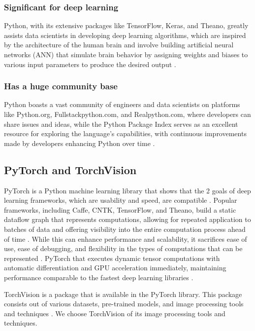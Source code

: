 \documentclass[conference]{IEEEtran}
\begin{document}
\subsubsection{Significant for deep learning}

Python, with its extensive packages like TensorFlow, Keras, and Theano, greatly assists data scientists in developing deep learning algorithms, which are inspired by the architecture of the human brain and involve building artificial neural networks (ANN) that simulate brain behavior by assigning weights and biases to various input parameters to produce the desired output \cite{b8}.

\subsubsection{Has a huge community base}

Python boasts a vast community of engineers and data scientists on platforms like Python.org, Fullstackpython.com, and Realpython.com, where developers can share issues and ideas, while the Python Package Index serves as an excellent resource for exploring the language's capabilities, with continuous improvements made by developers enhancing Python over time \cite{b8}.

\subsection{PyTorch and TorchVision}

PyTorch is a Python machine learning library that shows that the 2 goals of deep learning frameworks, which are usability and speed, are compatible \cite{b9}. Popular frameworks, including Caffe, CNTK, TensorFlow, and Theano, build a static dataflow graph that represents computations, allowing for repeated application to batches of data and offering visibility into the entire computation process ahead of time \cite{b9}. While this can enhance performance and scalability, it sacrifices ease of use, ease of debugging, and flexibility in the types of computations that can be represented \cite{b9}. PyTorch that executes dynamic tensor computations with automatic differentiation and GPU acceleration immediately, maintaining performance comparable to the fastest deep learning libraries \cite{b9}.

TorchVision is a package that is available in the PyTorch library. This package consists out of various datasets, pre-trained models, and image processing tools and techniques \cite{b10}. We choose TorchVision of its image processing tools and techniques.
\end{document}

